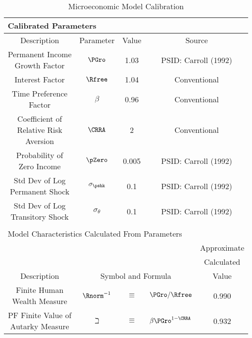 \begin{table}
\begin{center}\renewcommand{\arraystretch}{1.5}
\caption{Microeconomic Model Calibration}\label{table:Calibration}
\begin{tabular}{|c|ccl|c|}
\hline
\multicolumn{5}{|l|}{Calibrated Parameters}  \\ \hline
Description                     & \multicolumn{1}{c}{Parameter} & Value & \multicolumn{2}{c|}{Source}\\ \hline
Permanent Income Growth Factor  & \multicolumn{1}{c}{$\PGro$} & 1.03 & \multicolumn{2}{c|}{PSID: Carroll (1992)} \\
Interest Factor                 & \multicolumn{1}{c}{$\Rfree$} & 1.04 & \multicolumn{2}{c|}{Conventional} \\
Time Preference Factor          & \multicolumn{1}{c}{$\beta$} & 0.96 & \multicolumn{2}{c|}{Conventional} \\
Coefficient of Relative Risk Aversion & \multicolumn{1}{c}{$\CRRA$} & 2 & \multicolumn{2}{c|}{Conventional} \\
Probability of Zero Income      & \multicolumn{1}{c}{$\pZero$} & 0.005 & \multicolumn{2}{c|}{PSID: Carroll (1992)} \\
Std Dev of Log Permanent Shock  & \multicolumn{1}{c}{$\sigma_{\pshk}$} & 0.1 & \multicolumn{2}{c|}{PSID: Carroll (1992)} \\
Std Dev of Log Transitory Shock & \multicolumn{1}{c}{$\sigma_{\theta}$} & 0.1 & \multicolumn{2}{c|}{PSID: Carroll (1992)} \\ \hline
\multicolumn{5}{l}{}  \\ \hline
\multicolumn{5}{|l|}{Model Characteristics Calculated From Parameters}  \\ \hline
                                            & \multicolumn{3}{c|}{}                                      & Approximate \\
                                            & \multicolumn{3}{c|}{}                                       & Calculated \\
Description                                 & \multicolumn{3}{c|}{Symbol and Formula}                       & Value \\ \hline
Finite Human Wealth Measure                 & $\Rnorm^{-1}$ & $\equiv$ & $\PGro/\Rfree$                    & 0.990 \\
PF Finite Value of Autarky Measure& $\beth$ & $\equiv$ & $\beta \PGro^{1-\CRRA}$                    & 0.932 \\

\end{tabular}
\end{center}
\end{table}
